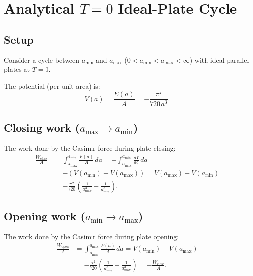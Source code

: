 \documentclass[11pt]{article}
\begin{document}
\section{Analytical $T = 0$ Ideal-Plate Cycle}

\subsection{Setup}

Consider a cycle between $a_\mathrm{min}$ and $a_\mathrm{max}$
($0 < a_\mathrm{min} < a_\mathrm{max} < \infty$)
with ideal parallel plates at $T = 0$.

The potential (per unit area) is:
\begin{equation}
  V(a) = \frac{E(a)}{A} = -\frac{\pi^2}{720\, a^3}.
  \label{eq:potential}
\end{equation}

\subsection{Closing work ($a_\mathrm{max} \to a_\mathrm{min}$)}

The work done by the Casimir force during plate closing:
\begin{align}
  \frac{W_\mathrm{close}}{A}
  &= \int_{a_\mathrm{max}}^{a_\mathrm{min}} \frac{F(a)}{A}\, da
  = -\int_{a_\mathrm{max}}^{a_\mathrm{min}} \frac{dV}{da}\, da
  \nonumber \\
  &= -(V(a_\mathrm{min}) - V(a_\mathrm{max}))
  = V(a_\mathrm{max}) - V(a_\mathrm{min})
  \nonumber \\
  &= -\frac{\pi^2}{720}\left(\frac{1}{a_\mathrm{max}^3}
     - \frac{1}{a_\mathrm{min}^3}\right).
  \label{eq:wclose}
\end{align}

%

\subsection{Opening work ($a_\mathrm{min} \to a_\mathrm{max}$)}

The work done by the Casimir force during plate opening:
\begin{align}
  \frac{W_\mathrm{open}}{A}
  &= \int_{a_\mathrm{min}}^{a_\mathrm{max}} \frac{F(a)}{A}\, da
  = V(a_\mathrm{min}) - V(a_\mathrm{max})
  \nonumber \\
  &= -\frac{\pi^2}{720}\left(\frac{1}{a_\mathrm{min}^3}
     - \frac{1}{a_\mathrm{max}^3}\right)
  = -\frac{W_\mathrm{close}}{A}.
  \label{eq:wopen}
\end{align}
\end{document}
